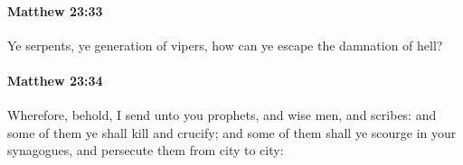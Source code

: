 		\paragraph{Matthew 23:33} %
			\label{MATTHEW-23-33}

			Ye serpents, ye generation of vipers, how can ye escape the damnation of hell?

			\begin{framed}
			\scriptsize
				\begin{compactdesc}
					\item[SBLG] 
				\end{compactdesc}
			\end{framed}

		\paragraph{Matthew 23:34} %
			\label{MATTHEW-23-34}

			Wherefore, behold, I send unto you prophets, and wise men, and scribes: and some of them ye shall kill and crucify; and some of them shall ye scourge in your synagogues, and persecute them from city to city:

